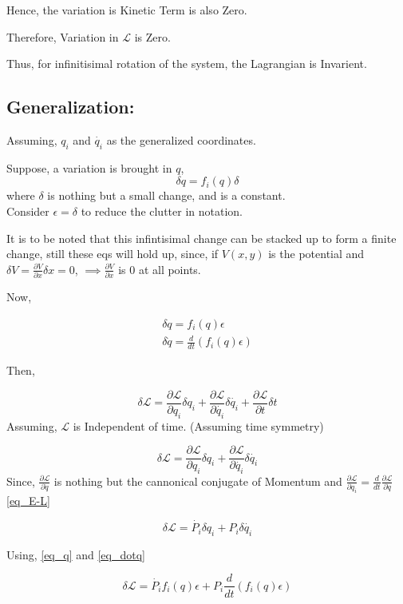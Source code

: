 \documentclass[a4paper]{article}
\newcommand{\Lagr}{\mathcal{L}}
\newcommand{\ddt}{\frac{d}{dt}}
\newcommand{\pdt}[2]{\frac{\partial #1}{\partial #2}}
\begin{document}
			Hence, the variation is Kinetic Term is also Zero.

			Therefore, Variation in $\Lagr$ is Zero.

			Thus, for infinitisimal rotation of the system, the Lagrangian is Invarient.
			
		\subsection*{Generalization: }

			\noindent

			Assuming, $q_i$ and $\dot{q_i}$ as the generalized coordinates.

			Suppose, a variation is brought in $q$,
			$$ \delta q = f_i(q) \delta $$ where $\delta$ is nothing but a small change, and is a constant. \hfill \\
			Consider $\epsilon = \delta$ to reduce the clutter in notation.

			It is to be noted that this infintisimal change can be stacked up to form a finite change, still these eqs will hold up, since, if $V(x, y)$ is the potential and $\delta V = \pdt{V}{x}\delta x = 0$, $\implies \pdt{V}{x}$ is $0$ at all points.

			Now,

			\begin{eqnarray}
				\delta q = f_i(q) \epsilon \label{eq_q} \\
				\delta \dot{q} = \ddt(f_i(q) \epsilon) \label{eq_dotq}
			\end{eqnarray}
			
			Then,

			$$ \delta \Lagr = \pdt{\Lagr}{q_i}\delta q_i + \pdt{\Lagr}{\dot{q_i}}\delta \dot{q_i} + \pdt{\Lagr}{t} \delta t $$
			Assuming, $\Lagr$ is Independent of time. (Assuming time symmetry)

			$$ \delta \Lagr = \pdt{\Lagr}{q_i}\delta q_i + \pdt{\Lagr}{\dot{q_i}}\delta \dot{q_i} $$
			Since, $\pdt{\Lagr}{\dot{q}}$ is nothing but the cannonical conjugate of Momentum and $\pdt{\Lagr}{q_i}=\ddt \pdt{\Lagr}{\dot{q}}$\eqref{eq_E-L}

			\begin{equation}
				\delta \Lagr = \dot{P_i}\delta q_i + P_i \delta \dot{q_i} \label{eq_var_L}
			\end{equation}

			Using, \eqref{eq_q} and \eqref{eq_dotq}

			$$ \delta \Lagr = \dot{P_i} f_i(q) \epsilon + P_i \ddt(f_i(q)\epsilon) $$
\end{document}
